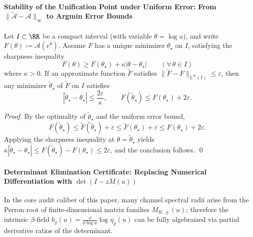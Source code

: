 \paragraph{Stability of the Unification Point under Uniform Error: From \texorpdfstring{$\|\widetilde{\mathcal A}-\mathcal A\|_\infty$}{sup} to Argmin Error Bounds}
\begin{theorem}\label{thm:gut-argmin-stability}
Let \(I\subset\RR\) be a compact interval (with variable \(\theta=\log u\)), and write \(F(\theta):=\mathcal{A}(e^\theta)\).
Assume \(F\) has a unique minimizer \(\theta_\star\) on \(I\), satisfying the sharpness inequality
\[
F(\theta)\ge F(\theta_\star)+\kappa|\theta-\theta_\star|\qquad(\forall\,\theta\in I)
\]
where \(\kappa>0\).
If an approximate function \(\widetilde F\) satisfies \(\|\widetilde F-F\|_{L^\infty(I)}\le \varepsilon\), then any minimizer \(\widetilde\theta_\star\) of \(\widetilde F\) on \(I\) satisfies
\[
|\widetilde\theta_\star-\theta_\star|\le \frac{2\varepsilon}{\kappa},
\qquad
F(\widetilde\theta_\star)\le F(\theta_\star)+2\varepsilon.
\]
\end{theorem}

\begin{proof}
By the optimality of \(\widetilde\theta_\star\) and the uniform error bound,
\[
F(\widetilde\theta_\star)\le \widetilde F(\widetilde\theta_\star)+\varepsilon
\le \widetilde F(\theta_\star)+\varepsilon
\le F(\theta_\star)+2\varepsilon.
\]
Applying the sharpness inequality at \(\theta=\widetilde\theta_\star\) yields
\(
\kappa|\widetilde\theta_\star-\theta_\star|\le F(\widetilde\theta_\star)-F(\theta_\star)\le 2\varepsilon
\),
and the conclusion follows. \qed
\end{proof}

\paragraph{Determinant Elimination Certificate: Replacing Numerical Differentiation with \texorpdfstring{$\det(I-zM(u))$}{det}}
In the core audit caliber of this paper, many channel spectral radii arise from the Perron root of finite-dimensional matrix families \(M_{K,\varrho}(u)\);
therefore the intrinsic \(\beta\)-field \(b_\varrho(u)=\frac{\dd}{\dd\log u}\log\eta_\varrho(u)\) can be fully algebraized via partial derivative ratios of the determinant.

